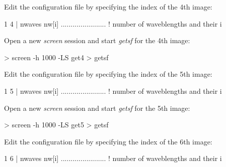\documentclass[a4paper,10pt]{article}
\begin{document}
Edit the configuration file by specifying the index of the 4th image:
\begin{verbnobox}[\mbox{}\small]
 1 4                 | nwaves nw[i] ....................... ! number of waveblengths and their i
\end{verbnobox}
Open a new \textsl{screen} session and start \textsl{getsf} for the 4th image:
\begin{verbnobox}[\mbox{}\small]
> screen -h 1000 -LS get4
> getsf
\end{verbnobox}
Edit the configuration file by specifying the index of the 5th image:
\begin{verbnobox}[\mbox{}\small]
 1 5                 | nwaves nw[i] ....................... ! number of waveblengths and their i
\end{verbnobox}
Open a new \textsl{screen} session and start \textsl{getsf} for the 5th image:
\begin{verbnobox}[\mbox{}\small]
> screen -h 1000 -LS get5
> getsf
\end{verbnobox}
Edit the configuration file by specifying the index of the 6th image:
\begin{verbnobox}[\mbox{}\small]
 1 6                 | nwaves nw[i] ....................... ! number of waveblengths and their i
\end{verbnobox}
\end{document}
